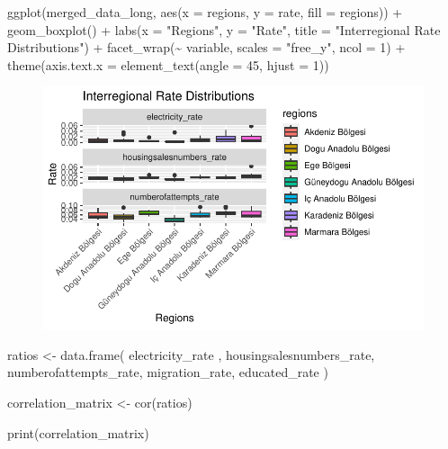 \documentclass[
  11pt,
  a4paper,
  DIV=11,
  numbers=noendperiod]{scrartcl}
\newenvironment{Shaded}{\begin{snugshade}}{\end{snugshade}}
\newcommand{\AttributeTok}[1]{\textcolor[rgb]{0.40,0.45,0.13}{#1}}
\newcommand{\DecValTok}[1]{\textcolor[rgb]{0.68,0.00,0.00}{#1}}
\newcommand{\FunctionTok}[1]{\textcolor[rgb]{0.28,0.35,0.67}{#1}}
\newcommand{\NormalTok}[1]{\textcolor[rgb]{0.00,0.23,0.31}{#1}}
\newcommand{\OtherTok}[1]{\textcolor[rgb]{0.00,0.23,0.31}{#1}}
\newcommand{\SpecialCharTok}[1]{\textcolor[rgb]{0.37,0.37,0.37}{#1}}
\newcommand{\StringTok}[1]{\textcolor[rgb]{0.13,0.47,0.30}{#1}}
\begin{document}
\begin{Shaded}
\begin{Highlighting}[]
\FunctionTok{ggplot}\NormalTok{(merged\_data\_long, }\FunctionTok{aes}\NormalTok{(}\AttributeTok{x =}\NormalTok{ regions, }\AttributeTok{y =}\NormalTok{ rate, }\AttributeTok{fill =}\NormalTok{ regions)) }\SpecialCharTok{+}
  \FunctionTok{geom\_boxplot}\NormalTok{() }\SpecialCharTok{+}
  \FunctionTok{labs}\NormalTok{(}\AttributeTok{x =} \StringTok{"Regions"}\NormalTok{, }\AttributeTok{y =} \StringTok{"Rate"}\NormalTok{, }\AttributeTok{title =} \StringTok{"Interregional Rate Distributions"}\NormalTok{) }\SpecialCharTok{+}
  \FunctionTok{facet\_wrap}\NormalTok{(}\SpecialCharTok{\textasciitilde{}}\NormalTok{ variable, }\AttributeTok{scales =} \StringTok{"free\_y"}\NormalTok{, }\AttributeTok{ncol =} \DecValTok{1}\NormalTok{) }\SpecialCharTok{+}
  \FunctionTok{theme}\NormalTok{(}\AttributeTok{axis.text.x =} \FunctionTok{element\_text}\NormalTok{(}\AttributeTok{angle =} \DecValTok{45}\NormalTok{, }\AttributeTok{hjust =} \DecValTok{1}\NormalTok{))}
\end{Highlighting}
\end{Shaded}

\begin{figure}[H]

{\centering \includegraphics{analysis_files/figure-pdf/unnamed-chunk-12-1.pdf}

}

\end{figure}

\begin{Shaded}
\begin{Highlighting}[]
\NormalTok{ratios }\OtherTok{\textless{}{-}} \FunctionTok{data.frame}\NormalTok{(}
\NormalTok{  electricity\_rate ,  }
\NormalTok{ housingsalesnumbers\_rate,}
\NormalTok{  numberofattempts\_rate,}
\NormalTok{  migration\_rate,}
\NormalTok{ educated\_rate}
\NormalTok{)}

\NormalTok{correlation\_matrix }\OtherTok{\textless{}{-}} \FunctionTok{cor}\NormalTok{(ratios)}

\FunctionTok{print}\NormalTok{(correlation\_matrix)}
\end{Highlighting}
\end{Shaded}
\end{document}
